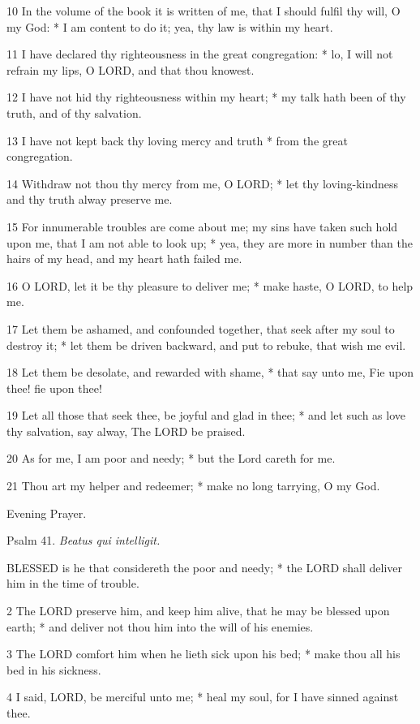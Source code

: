10 In the volume of the book it is written of me, that
I should fulfil thy will, O my God: * I am content to do it; yea, thy
law is within my heart.

11 I have declared thy righteousness in the great congregation:
* lo, I will not refrain my lips, O LORD, and that
thou knowest.

12 I have not hid thy righteousness within my heart;
* my talk hath been of thy truth, and of thy salvation.

13 I have not kept back thy loving mercy and truth
* from the great congregation.

14 Withdraw not thou thy mercy from me, O LORD;
* let thy loving-kindness and thy truth alway preserve me.

15 For innumerable troubles are come about me; my sins
have taken such hold upon me, that I am not able to look up; * yea, they
are more in number than the hairs of my head, and my heart hath failed
me.

16 O LORD, let it be thy pleasure
to deliver me; * make haste, O LORD, to help me.

17
Let them be ashamed, and confounded together, that seek after my soul
to destroy it; * let them be driven backward, and put to rebuke, that
wish me evil.

18 Let them be desolate, and rewarded with shame, *
that say unto me, Fie upon thee! fie upon thee!

19 Let all those that seek thee, be joyful and glad
in thee; * and let such as love thy salvation, say alway, The LORD
be praised.

20 As for me, I am poor and needy; * but the Lord careth
for me.

21 Thou art my helper and redeemer; * make no long
tarrying, O my God.

Evening
Prayer.

Psalm
41. \emph{Beatus qui intelligit.}

BLESSED
is he that considereth the poor and needy; * the LORD
shall deliver him in the time of trouble.

2 The LORD preserve him, and
keep him alive, that he may be blessed upon earth; * and deliver not thou
him into the will of his enemies.

3 The LORD comfort him when
he lieth sick upon his bed; * make thou all his bed in his sickness.

4 I said, LORD, be merciful
unto me; * heal my soul, for I have sinned against thee.

